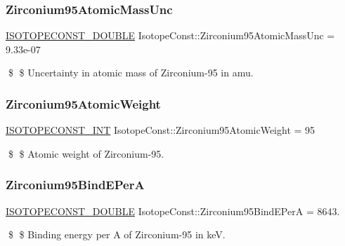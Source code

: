 \subsubsection{\texorpdfstring{Zirconium95\+Atomic\+Mass\+Unc}{Zirconium95AtomicMassUnc}}
{\footnotesize\ttfamily \mbox{\hyperlink{group___isotope_const-_macros_ga8f45a7272ce02c0b4c65c44636ed719a}{I\+S\+O\+T\+O\+P\+E\+C\+O\+N\+S\+T\+\_\+\+D\+O\+U\+B\+LE}} Isotope\+Const\+::\+Zirconium95\+Atomic\+Mass\+Unc = 9.\+33e-\/07}

\$ \$ Uncertainty in atomic mass of Zirconium-\/95 in amu. \mbox{\label{group___isotope_const-_zirconium-_zr95_ga961a212eb75464a8f84d573fee3a4113}} 
\subsubsection{\texorpdfstring{Zirconium95\+Atomic\+Weight}{Zirconium95AtomicWeight}}
{\footnotesize\ttfamily \mbox{\hyperlink{group___isotope_const-_macros_ga5f18360b3e99483a35c32d789e62621c}{I\+S\+O\+T\+O\+P\+E\+C\+O\+N\+S\+T\+\_\+\+I\+NT}} Isotope\+Const\+::\+Zirconium95\+Atomic\+Weight = 95}

\$ \$ Atomic weight of Zirconium-\/95. \mbox{\label{group___isotope_const-_zirconium-_zr95_gac2803ba39ee4e1e176990f658ce11f6c}} 
\subsubsection{\texorpdfstring{Zirconium95\+Bind\+E\+PerA}{Zirconium95BindEPerA}}
{\footnotesize\ttfamily \mbox{\hyperlink{group___isotope_const-_macros_ga8f45a7272ce02c0b4c65c44636ed719a}{I\+S\+O\+T\+O\+P\+E\+C\+O\+N\+S\+T\+\_\+\+D\+O\+U\+B\+LE}} Isotope\+Const\+::\+Zirconium95\+Bind\+E\+PerA = 8643.}

\$ \$ Binding energy per A of Zirconium-\/95 in keV. \mbox{\label{group___isotope_const-_zirconium-_zr95_gaa4df9e79d69667f0888159c75c6a3be9}} 
